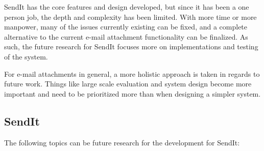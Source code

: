 SendIt has the core features and design developed, but since it has been a one person job, the depth and complexity has been limited. With more time or more manpower, many of the issues currently existing can be fixed, and a complete alternative to the current e-mail attachment functionality can be finalized. As such, the future research for SendIt focuses more on implementations and testing of the system.

For e-mail attachments in general, a more holistic approach is taken in regards to future work. Things like large scale evaluation and system design become more important and need to be prioritized more than when designing a simpler system.
%
\subsection{SendIt}
%
The following topics can be future research for the development for SendIt:
